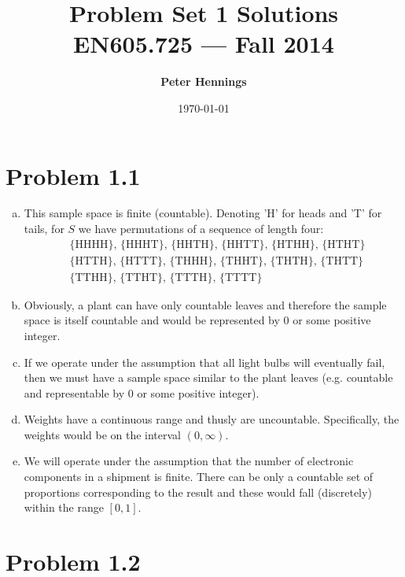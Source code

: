 \documentclass[11pt]{article}
\title{\bf Problem Set 1 Solutions\\[2ex] 
       \rm\normalsize EN605.725 --- Fall 2014}
\date{\today}
\author{\bf Peter Hennings}
\begin{document}
\maketitle

\section*{Problem 1.1} 

\begin{enumerate}[(a)]
    \item This sample space is finite (countable).  Denoting 'H' for heads and 'T' for tails, for $S$ we have permutations of a sequence of length four:
        \begin{align*}
            &\text{\{HHHH\}, \{HHHT\}, \{HHTH\}, \{HHTT\}, \{HTHH\}, \{HTHT\}} \\
            &\text{\{HTTH\}, \{HTTT\}, \{THHH\}, \{THHT\}, \{THTH\}, \{THTT\}} \\
            &\text{\{TTHH\}, \{TTHT\}, \{TTTH\}, \{TTTT\}}
        \end{align*}
    \item Obviously, a plant can have only countable leaves and therefore the sample space is itself countable and would be represented by 0 or some positive integer.
    \item If we operate under the assumption that all light bulbs will eventually fail, then we must have a sample space similar to the plant leaves (e.g. countable and representable by 0 or some positive integer).
    \item Weights have a continuous range and thusly are uncountable.  Specifically, the weights would be on the interval $(0, \infty)$.
    \item We will operate under the assumption that the number of electronic components in a shipment is finite.  There can be only a countable set of proportions corresponding to the result and these would fall (discretely) within the range $[0,1]$.
\end{enumerate}

\section*{Problem 1.2}
\end{document}
